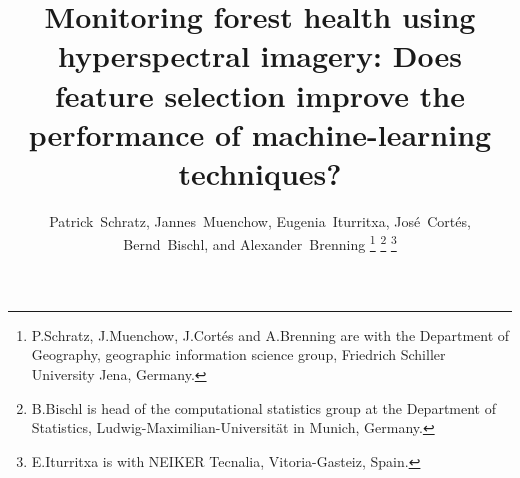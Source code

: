 \documentclass[final]{IEEEtran}
\begin{document}
%
\title{Monitoring forest health using hyperspectral imagery: Does feature selection improve the performance of machine-learning techniques?}
%
%
%


\author{Patrick~Schratz,
	Jannes~Muenchow,
	Eugenia~Iturritxa,
	José~Cortés,
	Bernd~Bischl,
	and Alexander~Brenning
	\thanks{P.Schratz, J.Muenchow, J.Cortés and A.Brenning are with the Department
		of Geography, geographic information science group, Friedrich Schiller University Jena, Germany.}%
	\thanks{B.Bischl is head of the computational statistics group at the Department of Statistics, Ludwig-Maximilian-Universität in Munich, Germany.}%
	\thanks{E.Iturritxa is with NEIKER Tecnalia, Vitoria-Gasteiz, Spain.}%
}

%
%
\end{document}
